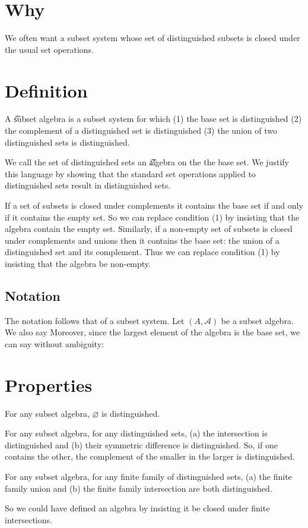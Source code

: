 

\section*{Why}

We often want a subset system whose set of distinguished subsets is closed under the usual set operations.

\section*{Definition}

A \t{subset algebra} is a subset system for which (1) the base set is distinguished (2) the complement of a distinguished set is distinguished (3) the union of two distinguished sets is distinguished.

We call the set of distinguished sets an \t{algebra} on the the base set.
We justify this language by showing that the standard set operations applied to distinguished sets result in distinguished sets.

If a set of subsets is closed under complements it contains the base set if and only if it contains the empty set.
So we can replace condition (1) by insisting that the algebra contain the empty set.
Similarly, if a non-empty set of subsets is closed under complements and unions then it contains the base set: the union of a distinguished set and its complement.
Thus we can replace condition (1) by insisting that the algebra be non-empty.

\subsection*{Notation}

The notation follows that of a subset system.
Let $(A, \mathcal{A} )$ be a subset algebra.
We also say 
Moreover, since the largest element of the algebra is the base set, we can say without ambiguity: 

\section*{Properties}

\begin{proposition}
For any subset algebra, $\varnothing$ is distinguished.\end{proposition}
\begin{proposition}
For any subset algebra,
for any distinguished sets,
(a) the intersection is distinguished and
(b) their symmetric difference is distinguished.
So, if one contains the other, the complement
of the smaller in the larger is distinguished.\end{proposition}
\begin{proposition}
For any subset algebra,
for any finite family of distinguished sets,
(a) the finite family union and
(b) the finite family intersection
are both distinguished.\end{proposition}
So we could have defined an algebra
by insisting it be closed under finite
intersections.

